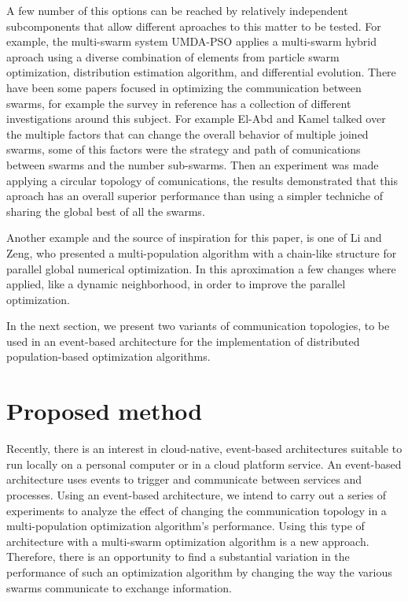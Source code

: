 \documentclass[runningheads]{llncs}
\begin{document}
A few number of this options can be reached by relatively independent
subcomponents that allow different aproaches to this matter to be
tested. For example, the multi-swarm system UMDA-PSO \cite{b10} 
applies a multi-swarm hybrid aproach using a diverse combination of 
elements from particle swarm optimization, distribution estimation 
algorithm, and differential evolution. %
There have been some papers focused in optimizing the communication
between swarms, for example the survey in reference \cite{b15} has a
collection of different investigations around this subject. For
example El-Abd and Kamel talked over the multiple factors that can
change the overall behavior of multiple joined swarms, some of this factors
were the strategy and path of comunications between swarms and the number sub-swarms. 
Then an experiment was made applying a circular topology of comunications, 
the results demonstrated that this aproach has an overall superior performance 
than using a simpler techniche of sharing the global best of all the swarms\cite{b16}. 

Another example and the source of inspiration for this paper, is one
of Li and Zeng, who presented a multi-population algorithm with a chain-like structure for parallel global
numerical optimization. In this aproximation a few changes where applied, like a dynamic neighborhood,
in order to improve the parallel optimization\cite{b17}. 

In the next section, we present two variants of communication topologies,
to be used in an event-based architecture for the implementation of 
distributed population-based optimization algorithms.

\section{Proposed method}

Recently, there is an interest in cloud-native, event-based architectures
suitable to run locally on a personal computer or in a cloud platform service.
An event-based architecture uses events to trigger and communicate between
services and processes. Using an event-based architecture, we intend to carry
out a series of experiments to analyze the effect of changing the communication
topology in a multi-population optimization algorithm's performance. Using this
type of architecture with a multi-swarm optimization algorithm is a new
approach. Therefore, there is an opportunity to find a substantial variation in
the performance of such an optimization algorithm by changing the way the
various swarms communicate to exchange information.
\end{document}
